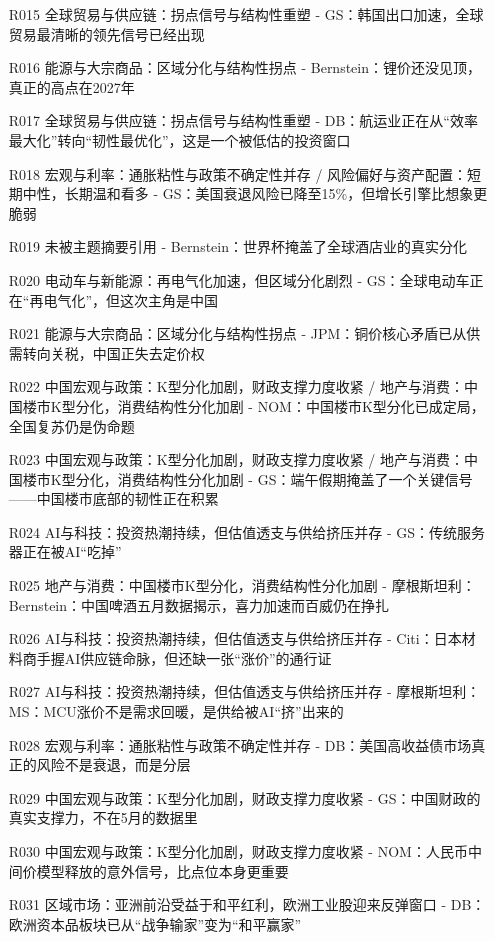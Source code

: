 \documentclass[11pt]{ctexart}
\begin{document}
\begin{itemize}
  \item [R015] 全球贸易与供应链：拐点信号与结构性重塑 - GS：韩国出口加速，全球贸易最清晰的领先信号已经出现
  \item [R016] 能源与大宗商品：区域分化与结构性拐点 - Bernstein：锂价还没见顶，真正的高点在2027年
  \item [R017] 全球贸易与供应链：拐点信号与结构性重塑 - DB：航运业正在从“效率最大化”转向“韧性最优化”，这是一个被低估的投资窗口
  \item [R018] 宏观与利率：通胀粘性与政策不确定性并存 / 风险偏好与资产配置：短期中性，长期温和看多 - GS：美国衰退风险已降至15\%，但增长引擎比想象更脆弱
  \item [R019] 未被主题摘要引用 - Bernstein：世界杯掩盖了全球酒店业的真实分化
  \item [R020] 电动车与新能源：再电气化加速，但区域分化剧烈 - GS：全球电动车正在“再电气化”，但这次主角是中国
  \item [R021] 能源与大宗商品：区域分化与结构性拐点 - JPM：铜价核心矛盾已从供需转向关税，中国正失去定价权
  \item [R022] 中国宏观与政策：K型分化加剧，财政支撑力度收紧 / 地产与消费：中国楼市K型分化，消费结构性分化加剧 - NOM：中国楼市K型分化已成定局，全国复苏仍是伪命题
  \item [R023] 中国宏观与政策：K型分化加剧，财政支撑力度收紧 / 地产与消费：中国楼市K型分化，消费结构性分化加剧 - GS：端午假期掩盖了一个关键信号——中国楼市底部的韧性正在积累
  \item [R024] AI与科技：投资热潮持续，但估值透支与供给挤压并存 - GS：传统服务器正在被AI“吃掉”
  \item [R025] 地产与消费：中国楼市K型分化，消费结构性分化加剧 - 摩根斯坦利：Bernstein：中国啤酒五月数据揭示，喜力加速而百威仍在挣扎
  \item [R026] AI与科技：投资热潮持续，但估值透支与供给挤压并存 - Citi：日本材料商手握AI供应链命脉，但还缺一张“涨价”的通行证
  \item [R027] AI与科技：投资热潮持续，但估值透支与供给挤压并存 - 摩根斯坦利：MS：MCU涨价不是需求回暖，是供给被AI“挤”出来的
  \item [R028] 宏观与利率：通胀粘性与政策不确定性并存 - DB：美国高收益债市场真正的风险不是衰退，而是分层
  \item [R029] 中国宏观与政策：K型分化加剧，财政支撑力度收紧 - GS：中国财政的真实支撑力，不在5月的数据里
  \item [R030] 中国宏观与政策：K型分化加剧，财政支撑力度收紧 - NOM：人民币中间价模型释放的意外信号，比点位本身更重要
  \item [R031] 区域市场：亚洲前沿受益于和平红利，欧洲工业股迎来反弹窗口 - DB：欧洲资本品板块已从“战争输家”变为“和平赢家”

\end{itemize}
\end{document}
